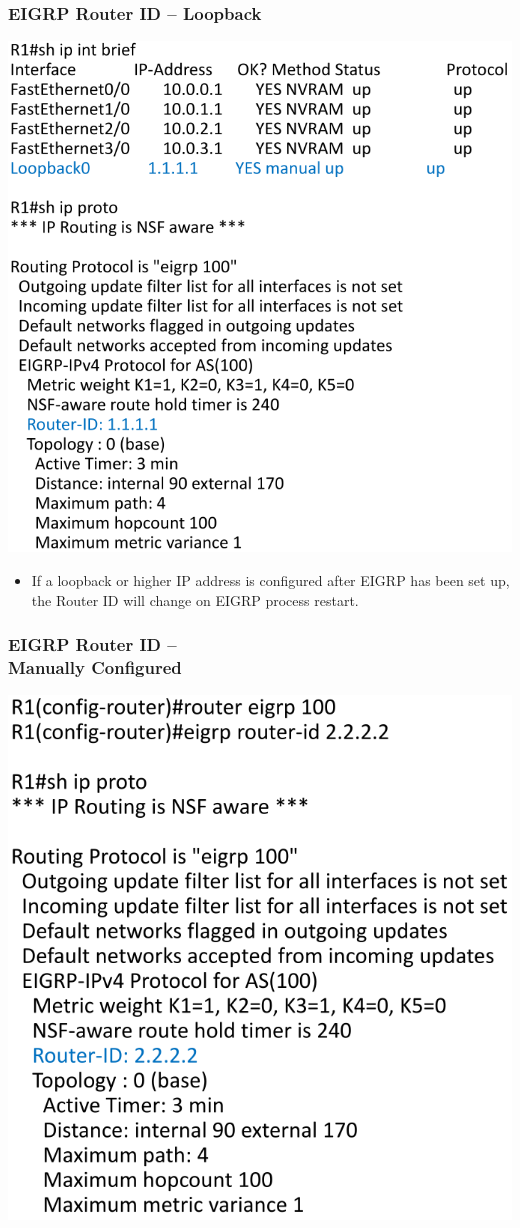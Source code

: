 \documentclass[pdflatex,compress,mathserif]{beamer}
\begin{document}
\begin{frame}
	\frametitle{EIGRP Router ID – Loopback}
	\begin{multicols}{2}
		\begin{center}
			\includegraphics[width=\linewidth]{img/img21}
		\end{center}
		\columnbreak
		\begin{itemize}
			\item If a loopback or higher IP
address is configured after
EIGRP has been set up, the
Router ID will change on
EIGRP process restart.
		\end{itemize}
	\end{multicols}
\end{frame}

\begin{frame}
	\frametitle{EIGRP Router ID –\\ Manually Configured}
	\begin{center}
		\includegraphics[width=0.6\linewidth]{img/img22}
	\end{center}
\end{frame}
\end{document}
